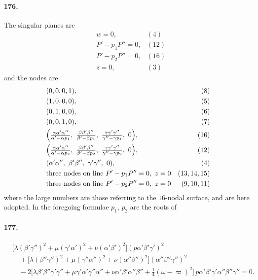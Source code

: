 \documentclass[11pt,a4paper]{article}
\begin{document}
\paragraph{176.}
The singular planes are
\[
\begin{aligned}
& w = 0, & (4) \\
& P' - p_1 P'' = 0, & (12) \\
& P' - p_2 P'' = 0, & (16) \\
& z = 0, & (3)
\end{aligned}
\]
and the nodes are
\[
\begin{aligned}
& (0, 0, 0, 1), & (8) \\
& (1, 0, 0, 0), & (5) \\
& (0, 1, 0, 0), & (6) \\
& (0, 0, 1, 0), & (7) \\
& \Bigl(\tfrac{\alpha\alpha'\alpha''}{\alpha' - \alpha p_1},\ \tfrac{\beta\beta'\beta''}{\beta' - \beta p_1},\ \tfrac{\gamma\gamma'\gamma''}{\gamma'' - \gamma p_1},\ 0\Bigr), & (16) \\
& \Bigl(\tfrac{\alpha\alpha'\alpha''}{\alpha' - \alpha p_2},\ \tfrac{\beta\beta'\beta''}{\beta' - \beta p_2},\ \tfrac{\gamma\gamma'\gamma''}{\gamma'' - \gamma p_2},\ 0\Bigr), & (12) \\
& (\alpha'\alpha'',\ \beta'\beta'',\ \gamma'\gamma'',\ 0), & (4) \\
& \text{three nodes on line}\ P' - p_1 P'' = 0,\ z = 0 & (13, 14, 15) \\
& \text{three nodes on line}\ P' - p_2 P'' = 0,\ z = 0 & (9, 10, 11)
\end{aligned}
\]
where the large numbers are those referring to the $16$-nodal surface,
and are here adopted. In the foregoing formulae $p_1$, $p_2$ are the
roots of

\paragraph{177.}
\[
\begin{aligned}
& \bigl[\lambda(\beta'\gamma'')^2 + \mu(\gamma'\alpha')^2 + \nu(\alpha'\beta')^2\bigr](p\alpha'\beta'\gamma')^2 \\
& \quad + \bigl[\lambda(\beta''\gamma'')^2 + \mu(\gamma''\alpha'')^2 + \nu(\alpha''\beta'')^2\bigr](\alpha''\beta''\gamma'')^2 \\
& \quad - 2\bigl[\lambda\beta'\beta''\gamma'\gamma'' + \mu\gamma'\alpha'\gamma''\alpha''
+ \nu\alpha'\beta'\alpha''\beta'' + \tfrac{1}{4}(\omega - \varpi)^2\bigr]
\, p\alpha'\beta'\gamma'\alpha''\beta''\gamma'' = 0.
\end{aligned}
\]
\end{document}
